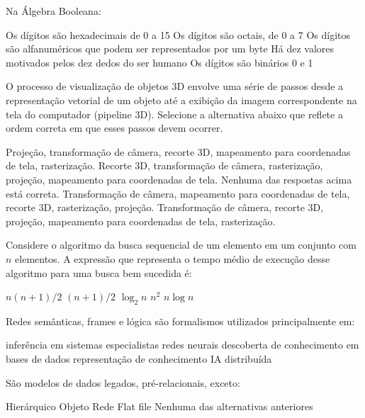 \documentclass[12pt, addpoints]{exam}
\begin{document}
\begin{questions}
\question

Na Álgebra Booleana:
\begin{choices}
\choice Os dígitos são hexadecimais de 0 a 15
\choice Os dígitos são octais, de 0 a 7
\choice Os dígitos são alfanuméricos que podem ser representados por um byte
\choice Há dez valores motivados pelos dez dedos do ser humano
\choice Os dígitos são binários 0 e 1
\end{choices}

\question

O processo de visualização de objetos 3D envolve uma série de passos desde a representação vetorial de um objeto até a exibição da imagem correspondente na tela do computador (pipeline 3D). Selecione a alternativa abaixo que reflete a ordem correta em que esses passos devem ocorrer. 
\begin{choices}
\choice Projeção, transformação de câmera, recorte 3D, mapeamento para coordenadas de tela, rasterização. 
\choice Recorte 3D, transformação de câmera, rasterização, projeção, mapeamento para coordenadas de tela. 
\choice Nenhuma das respostas acima está correta.
\choice Transformação de câmera, mapeamento para coordenadas de tela, recorte 3D, rasterização, projeção. 
\choice Transformação de câmera, recorte 3D, projeção, mapeamento para coordenadas de tela, rasterização. 
\end{choices}

\question

Considere o algoritmo da busca sequencial de um elemento em um conjunto com \( n \) elementos. A expressão que representa o tempo médio de execução desse algoritmo para uma busca bem sucedida é:
\begin{choices}
\choice \( n(n + 1)/2 \)
\choice \( (n + 1)/2 \)
\choice \( \log_2 n \)
\choice \( n^2 \)
\choice \( n \log n \)
\end{choices}

\question

Redes semânticas, frames e lógica são formalismos utilizados principalmente em: 
\begin{choices}
\choice inferência em sistemas especialistas
\choice redes neurais
\choice descoberta de conhecimento em bases de dados
\choice representação de conhecimento
\choice IA distribuída
\end{choices}

\question

São modelos de dados legados, pré-relacionais, exceto:


\begin{choices}
\choice Hierárquico
\choice Objeto
\choice Rede
\choice Flat file
\choice Nenhuma das alternativas anteriores
\end{choices}


\end{questions}
\end{document}
